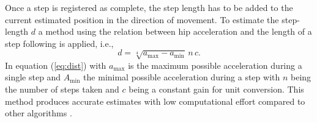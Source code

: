 \documentclass[engproc,conferenceproceedings,submit,pdftex,moreauthors]{Definitions/mdpi}
\begin{document}
Once  a step is registered as complete, the step length has to be added to the current estimated position in the direction of movement. To estimate the step-length $d$ a method  using the relation between hip acceleration and the length of a step following  \cite{weinberg2002} is applied, i.e.,
 \begin{equation}\label{eq:dist}
	d = \sqrt[4]{a_{\max}-a_{\min}} \, n \, c.
\end{equation}
In equation (\ref{eq:dist}) with $a_{\max}$ is the maximum possible acceleration during a single step and $A_{\min}$ the minimal possible acceleration during a step with $n$ being the number of steps taken and $c$ being a constant gain for unit conversion. This method produces accurate estimates with low computational effort compared to other algorithms \cite{petukhov2022, shin2007, zizzo2017}.



 
\end{document}
